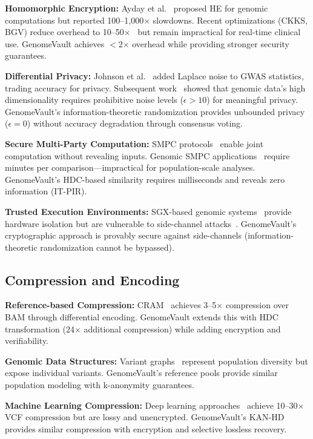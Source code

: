 \documentclass[12pt,a4paper]{article}
\begin{document}
\textbf{Homomorphic Encryption:} Ayday et al.~\cite{Ayday2013} proposed HE for genomic computations but reported 100--1,000$\times$ slowdowns. Recent optimizations (CKKS, BGV) reduce overhead to 10--50$\times$~\cite{Cheon2017} but remain impractical for real-time clinical use. GenomeVault achieves $<$2$\times$ overhead while providing stronger security guarantees.

\textbf{Differential Privacy:} Johnson et al.~\cite{Johnson2013} added Laplace noise to GWAS statistics, trading accuracy for privacy. Subsequent work~\cite{Simmons2016} showed that genomic data's high dimensionality requires prohibitive noise levels ($\epsilon > 10$) for meaningful privacy. GenomeVault's information-theoretic randomization provides unbounded privacy ($\epsilon = 0$) without accuracy degradation through consensus voting.

\textbf{Secure Multi-Party Computation:} SMPC protocols~\cite{Yao1986} enable joint computation without revealing inputs. Genomic SMPC applications~\cite{Kamm2013} require minutes per comparison---impractical for population-scale analyses. GenomeVault's HDC-based similarity requires milliseconds and reveals zero information (IT-PIR).

\textbf{Trusted Execution Environments:} SGX-based genomic systems~\cite{Tople2018} provide hardware isolation but are vulnerable to side-channel attacks~\cite{VanBulck2018}. GenomeVault's cryptographic approach is provably secure against side-channels (information-theoretic randomization cannot be bypassed).

\subsection{Compression and Encoding}

\textbf{Reference-based Compression:} CRAM~\cite{Fritz2011} achieves 3--5$\times$ compression over BAM through differential encoding. GenomeVault extends this with HDC transformation (24$\times$ additional compression) while adding encryption and verifiability.

\textbf{Genomic Data Structures:} Variant graphs~\cite{Garrison2018} represent population diversity but expose individual variants. GenomeVault's reference pools provide similar population modeling with k-anonymity guarantees.

\textbf{Machine Learning Compression:} Deep learning approaches~\cite{Chandak2019} achieve 10--30$\times$ VCF compression but are lossy and unencrypted. GenomeVault's KAN-HD provides similar compression with encryption and selective lossless recovery.
\end{document}
